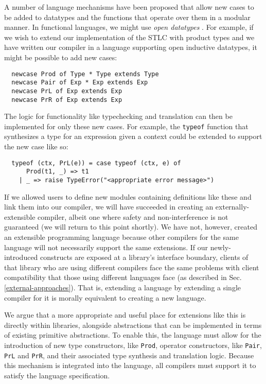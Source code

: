 A number of language mechanisms have been proposed that allow new cases to be added to datatypes and the functions that operate over them in a modular manner. 
In functional languages, we might use \emph{open datatypes} \cite{opendatatypes}. For example, if we wish to extend our implementation of the STLC with product types and we have written our compiler in a language supporting open inductive datatypes, it might be possible to add new cases: 
\begin{lstlisting}
  newcase Prod of Type * Type extends Type
  newcase Pair of Exp * Exp extends Exp
  newcase PrL of Exp extends Exp
  newcase PrR of Exp extends Exp
\end{lstlisting}

The logic for functionality like typechecking and translation can then be implemented for only these new cases. For example, the \lstinline{typeof} function that synthesizes a type for an expression given a context could be extended to support the new case  like so:
\begin{lstlisting}
  typeof (ctx, PrL(e)) = case typeof (ctx, e) of 
      Prod(t1, _) => t1 
    | _ => raise TypeError("<appropriate error message>")
\end{lstlisting}

If we allowed users to define new modules containing definitions like these and link them into our compiler, we will have succeeded in creating an externally-extensible compiler, albeit one where safety and non-interference is not guaranteed (we will return to this point shortly). We have not, however, created an extensible programming language because other compilers for the same language will not necessarily support the same extensions. 
If our newly-introduced constructs are exposed at a library's  interface boundary, clients of that library who are using different compilers face the same problems with client compatibility that those using different languages face (as described in Sec. \ref{external-approaches}). That is, {extending a language by extending a single compiler for it is morally equivalent to creating a new language}. 

We argue that a more appropriate and useful place for extensions like this is directly within libraries, alongside abstractions that can be implemented in terms of existing primitive abstractions. To enable this, the language must allow for the introduction of new type constructors, like \lstinline{Prod}, operator constructors, like \lstinline{Pair}, \lstinline{PrL} and \lstinline{PrR}, and their associated type synthesis and translation logic. Because this mechanism is integrated into the language, all compilers must support it to satisfy the language specification.

